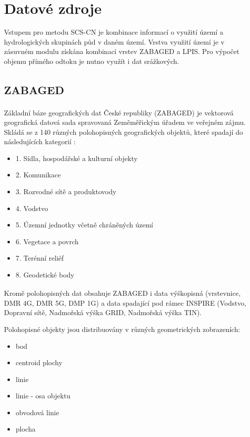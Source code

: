\documentclass[a4paper,oneside,12pt]{book}
\begin{document}
\section{Datové zdroje} \label{data}
\hspace{10mm} Vstupem pro metodu SCS-CN je kombinace informací o využití území a hydrologických skupinách půd v daném území. Vrstva využití území je v zásuvném modulu získána kombinací vrstev ZABAGED a LPIS. Pro výpočet objemu přímého odtoku je nutno využít i dat srážkových.

\newpage
\subsection{ZABAGED\texorpdfstring{\textsuperscript{\textregistered}}{ (R)}} \label{zabaged}

\hspace{10mm} Základní báze geografických dat České republiky (ZABAGED\texorpdfstring{\textsuperscript{\textregistered}}{ (R)}) je vektorová geografická datová sada spravovaná Zeměměřickým úřadem ve veřejném zájmu. Skládá se z 140 různých polohopisných geografických objektů, které spadají do následujících kategorií \cite{nEFEg7XpI9hVQCiO} :
\begin{itemize}
\item 1. Sídla, hospodářské a kulturní objekty
\item 2. Komunikace
\item 3. Rozvodné sítě a produktovody
\item 4. Vodstvo 
\item 5. Územní jednotky včetně chráněných území
\item 6. Vegetace a povrch
\item 7. Terénní reliéf
\item 8. Geodetické body
\end{itemize}
\hspace{10mm} Kromě polohopisných dat obsahuje ZABAGED\texorpdfstring{\textsuperscript{\textregistered}}{ (R)} i data výškopisná (vrstevnice, DMR 4G, DMR 5G, DMP 1G) a data spadající pod rámec INSPIRE (Vodstvo, Dopravní sítě, Nadmořská výška GRID, Nadmořská výška TIN). \cite{nEFEg7XpI9hVQCiO} 


\hspace{10mm} Polohopisné objekty jsou distribuovány v různých geometrických zobrazeních:
\begin{itemize}
\item bod
\item centroid plochy
\item linie
\item linie - osa objektu
\item obvodová linie
\item plocha
\end{itemize}
\end{document}
